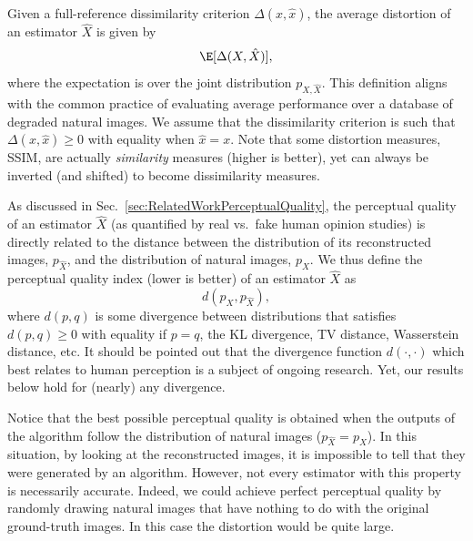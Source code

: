 Given a full-reference dissimilarity criterion $\Delta(x,\hat{x})$, the average distortion of an estimator $\hat{X}$ is given by
\begin{equation}\label{eq:AverageDistortion}
\E[\Delta(X,\hat{X})],
\end{equation}
where the expectation is over the joint distribution $p_{X,\hat{X}}$. This definition aligns with the common practice of evaluating average performance over a database of degraded natural images. We assume that the dissimilarity criterion is such that $\Delta(x,\hat{x}) \ge 0$ with equality when $\hat{x} = x$. Note that some distortion measures, \eg SSIM, are actually \emph{similarity} measures (higher is better), yet can always be inverted (and shifted) to become dissimilarity measures.

As discussed in Sec.~\ref{sec:RelatedWorkPerceptualQuality}, the perceptual quality of an estimator $\hat{X}$ (as quantified \eg by real vs.~fake human opinion studies) is directly related to the distance between the distribution of its reconstructed images, $p_{\hat{X}}$, and the distribution of natural images, $p_X$. We thus define the perceptual quality index (lower is better) of an estimator $\hat{X}$ as
\begin{equation}\label{eq:PerceptualQualityIndex}
d(p_X,p_{\hat{X}}),
\end{equation}
where $d(p,q)$ is some divergence between distributions that satisfies $d(p,q) \ge 0$ with equality if $p=q$, \eg the KL divergence, TV distance, Wasserstein distance, etc. It should be pointed out that the divergence function $d(\cdot,\cdot)$ which best relates to human perception is a subject of ongoing research. Yet, our results below hold for (nearly) any divergence.

Notice that the best possible perceptual quality is obtained when the outputs of the algorithm follow the distribution of natural images (\ie $p_{\hat{X}}=p_X$). In this situation, by looking at the reconstructed images, it is impossible to tell that they were generated by an algorithm. However, not every estimator with this property is necessarily accurate. Indeed, we could achieve perfect perceptual quality by randomly drawing natural images that have nothing to do with the original ground-truth images. In this case the distortion would be quite large.%

